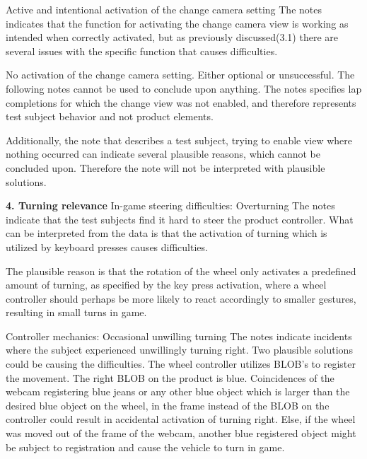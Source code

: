  Active and intentional activation of the change camera setting\newline
The notes indicates that the function for activating the change camera view is working as intended when correctly activated, but as previously discussed({\color{Red}3.1}) there are several issues with the specific function that causes difficulties.
\bigskip

 No activation of the change camera setting. Either optional or unsuccessful.\newline
The following notes cannot be used to conclude upon anything. The notes specifies lap completions for which the change view was not enabled, and therefore represents test subject behavior and not product elements.

Additionally, the note that describes a test subject, trying to enable view where nothing occurred can indicate several plausible reasons, which cannot be concluded upon. 
Therefore the note will not be interpreted with plausible solutions.
\bigskip

\noindent\textbf{4. Turning relevance}\newline
{} In-game steering difficulties: Overturning\newline
The notes indicate that the test subjects find it hard to steer the product controller. 
What can be interpreted from the data is that the activation of turning which is utilized by keyboard presses causes difficulties.

The plausible reason is that the rotation of the wheel only activates a predefined amount of turning, as specified by the key press activation, where a wheel controller should perhaps be more likely to react accordingly to smaller gestures, resulting in small turns in game.
\bigskip

 Controller mechanics: Occasional unwilling turning \newline
The notes indicate incidents where the subject experienced unwillingly turning right. 
Two plausible solutions could be causing the difficulties. 
The wheel controller utilizes BLOB’s to register the movement. 
The right BLOB on the product is blue. Coincidences of the webcam registering blue jeans or any other blue object which is larger than the desired blue object on the wheel, in the frame instead of the BLOB on the controller could result in accidental activation of turning right. 
Else, if the wheel was moved out of the frame of the webcam, another blue registered object might be subject to registration and cause the vehicle to turn in game.
\bigskip

